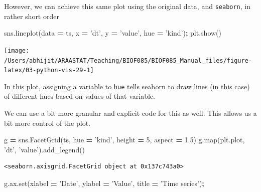 \documentclass[
  letterpaper,
]{scrbook}
\newenvironment{Shaded}{\begin{snugshade}}{\end{snugshade}}
\newcommand{\BuiltInTok}[1]{#1}
\newcommand{\DecValTok}[1]{\textcolor[rgb]{0.00,0.00,0.81}{#1}}
\newcommand{\FloatTok}[1]{\textcolor[rgb]{0.00,0.00,0.81}{#1}}
\newcommand{\NormalTok}[1]{#1}
\newcommand{\OperatorTok}[1]{\textcolor[rgb]{0.81,0.36,0.00}{\textbf{#1}}}
\newcommand{\StringTok}[1]{\textcolor[rgb]{0.31,0.60,0.02}{#1}}
\begin{document}
However, we can achieve this same plot using the original data, and \texttt{seaborn}, in rather short order

\begin{Shaded}
\begin{Highlighting}[]
\NormalTok{sns.lineplot(data }\OperatorTok{=}\NormalTok{ ts, x }\OperatorTok{=} \StringTok{'dt'}\NormalTok{, y }\OperatorTok{=} \StringTok{'value'}\NormalTok{, hue }\OperatorTok{=} \StringTok{'kind'}\NormalTok{)}\OperatorTok{;}
\NormalTok{plt.show()}
\end{Highlighting}
\end{Shaded}

\begin{center}\texttt{[image: /Users/abhijit/ARAASTAT/Teaching/BIOF085/BIOF085\_Manual\_files/figure-latex/03-python-vis-29-1]} \end{center}

In this plot, assigning a variable to \texttt{hue} tells seaborn to draw lines (in this case) of different hues based on values of that variable.

We can use a bit more granular and explicit code for this as well. This allows us a bit more control of the plot.

\begin{Shaded}
\begin{Highlighting}[]
\NormalTok{g }\OperatorTok{=}\NormalTok{ sns.FacetGrid(ts, hue }\OperatorTok{=} \StringTok{'kind'}\NormalTok{, height }\OperatorTok{=} \DecValTok{5}\NormalTok{, aspect }\OperatorTok{=} \FloatTok{1.5}\NormalTok{)}
\NormalTok{g.}\BuiltInTok{map}\NormalTok{(plt.plot, }\StringTok{'dt'}\NormalTok{, }\StringTok{'value'}\NormalTok{).add_legend()}
\end{Highlighting}
\end{Shaded}

\begin{verbatim}
<seaborn.axisgrid.FacetGrid object at 0x137c743a0>
\end{verbatim}

\begin{Shaded}
\begin{Highlighting}[]
\NormalTok{g.ax.}\BuiltInTok{set}\NormalTok{(xlabel }\OperatorTok{=} \StringTok{'Date'}\NormalTok{,}
\NormalTok{        ylabel }\OperatorTok{=} \StringTok{'Value'}\NormalTok{,}
\NormalTok{        title }\OperatorTok{=} \StringTok{'Time series'}\NormalTok{)}\OperatorTok{;}
\end{Highlighting}
\end{Shaded}
\end{document}

